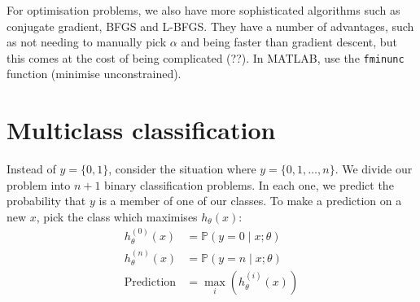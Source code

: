\documentclass[a4paper, 10pt, oneside]{book}
\begin{document}
For optimisation problems, we also have more sophisticated algorithms such as conjugate gradient, BFGS and L-BFGS. They have a number of advantages, such as not needing to manually pick $\alpha$ and being faster than gradient descent, but this comes at the cost of being complicated (??). In MATLAB, use the \texttt{fminunc} function (minimise unconstrained).

\section{Multiclass classification}

Instead of $y=\{0,1\}$, consider the situation where $y=\{0,1,\ldots, n\}$. We divide our problem into $n+1$ binary classification problems. In each one, we predict the probability that $y$ is a member of one of our classes. To make a prediction on a new $x$, pick the class which maximises $h_\theta(x)$:
\begin{align*}
	h_\theta^{(0)} (x) &= \mathbb P(y = 0 \mid x; \theta)\\
	h_\theta^{(n)} (x) &= \mathbb P(y = n \mid x; \theta) \\
	\text{Prediction} &= \max_i (h_\theta^{(i)} (x))
\end{align*}
\end{document}
